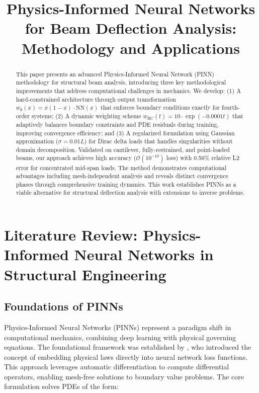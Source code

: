 \documentclass[12pt]{article}
\title{Physics-Informed Neural Networks for Beam Deflection Analysis: Methodology and Applications}
\author{}
\date{}
\begin{document}
\maketitle

\begin{abstract}
\noindent This paper presents an advanced Physics-Informed Neural Network (PINN) methodology for structural beam analysis, introducing three key methodological improvements that address computational challenges in mechanics. We develop: (1) A hard-constrained architecture through output transformation $w_{\theta}(x) = x(1-x)\cdot\textrm{NN}(x)$ that enforces boundary conditions exactly for fourth-order systems; (2) A dynamic weighting scheme $w_{\text{BC}}(t)=10\cdot\exp(-0.0001t)$ that adaptively balances boundary constraints and PDE residuals during training, improving convergence efficiency; and (3) A regularized formulation using Gaussian approximation ($\sigma = 0.01L$) for Dirac delta loads that handles singularities without domain decomposition. Validated on cantilever, fully-restrained, and point-loaded beams, our approach achieves high accuracy ($\mathcal{O}(10^{-10})$ loss) with 0.56\% relative L2 error for concentrated mid-span loads. The method demonstrates computational advantages including mesh-independent analysis and reveals distinct convergence phases through comprehensive training dynamics. This work establishes PINNs as a viable alternative for structural deflection analysis with extensions to inverse problems.
\end{abstract}

\section{Literature Review: Physics-Informed Neural Networks in Structural Engineering}
\subsection{Foundations of PINNs}
Physics-Informed Neural Networks (PINNs) represent a paradigm shift in computational mechanics, combining deep learning with physical governing equations. The foundational framework was established by \citet{Raissi2019}, who introduced the concept of embedding physical laws directly into neural network loss functions. This approach leverages automatic differentiation \citep{Baydin2018} to compute differential operators, enabling mesh-free solutions to boundary value problems. The core formulation solves PDEs of the form:
\end{document}
